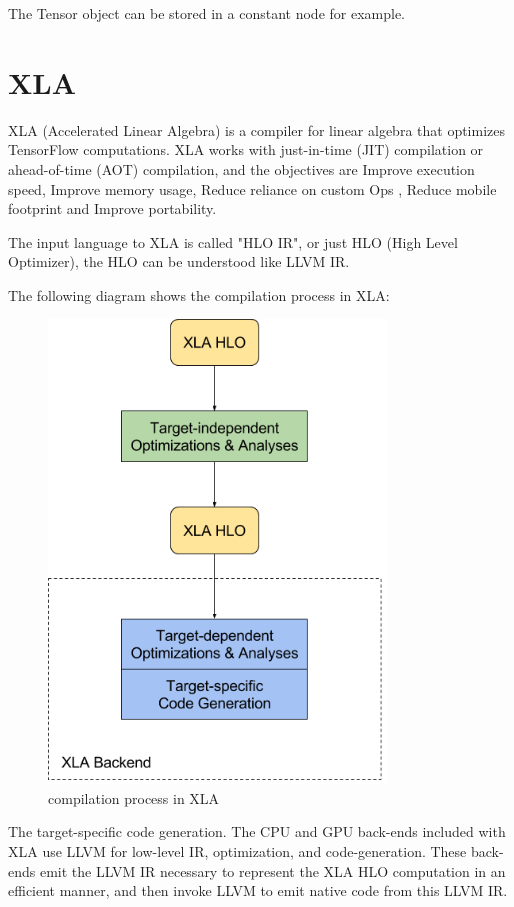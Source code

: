 \documentclass[11pt,openany]{book}
\begin{document}
The Tensor object can be stored in a constant node for example.

\chapter{XLA}

XLA (Accelerated Linear Algebra) is a compiler for linear algebra that optimizes TensorFlow computations. XLA works with just-in-time (JIT) compilation or ahead-of-time (AOT) compilation, and the objectives are Improve execution speed, Improve memory usage, Reduce reliance on custom Ops , Reduce mobile footprint and Improve portability.

The input language to XLA is called "HLO IR", or just HLO (High Level Optimizer), the HLO can be understood like LLVM IR.

The following diagram shows the compilation process in XLA:

\begin{figure}[h]
    \centering
    \includegraphics[width=0.8\textwidth]{img/how-does-xla-work.png}
    \caption{compilation process in XLA}
    \label{fig:const_add}
\end{figure}

The target-specific code generation. The CPU and GPU back-ends included with XLA use LLVM for low-level IR, optimization, and code-generation. These back-ends emit the LLVM IR necessary to represent the XLA HLO computation in an efficient manner, and then invoke LLVM to emit native code from this LLVM IR.
\end{document}
